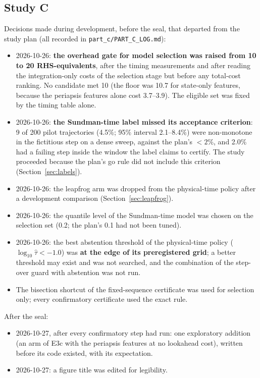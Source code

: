 \documentclass[10pt,letterpaper]{article}
\begin{document}
\subsection{Study C}
Decisions made during development, before the seal, that departed from the study plan (all recorded in \texttt{part\_c/PART\_C\_LOG.md}):
\begin{itemize}
\item 2026-10-26: \textbf{the overhead gate for model selection was raised from 10 to 20 RHS-equivalents}, after the timing measurements and after
reading the integration-only costs of the selection stage but before any total-cost ranking. No candidate met 10 (the floor was 10.7 for
state-only features, because the periapsis features alone cost 3.7--3.9). The eligible set was fixed by the timing table alone.
\item 2026-10-26: \textbf{the Sundman-time label missed its acceptance criterion}: 9 of 200 pilot trajectories (4.5\%; 95\% interval 2.1--8.4\%)
were non-monotone in the fictitious step on a dense sweep, against the plan's $<2\%$, and 2.0\% had a failing step inside the window the label
claims to certify. The study proceeded because the plan's go rule did not include this criterion (Section~\ref{sec:labels}).
\item 2026-10-26: the leapfrog arm was dropped from the physical-time policy after a development comparison (Section~\ref{sec:leapfrog}).
\item 2026-10-26: the quantile level of the Sundman-time model was chosen on the selection set (0.2; the plan's 0.1 had not been tuned).
\item 2026-10-26: the best abstention threshold of the physical-time policy ($\log_{10}\hat\tau < -1.0$) was \textbf{at the edge of its preregistered
grid}; a better threshold may exist and was not searched, and the combination of the step-over guard with abstention was not run.
\item The bisection shortcut of the fixed-sequence certificate was used for selection only; every confirmatory certificate used the exact rule.
\end{itemize}
After the seal:
\begin{itemize}
\item 2026-10-27, after every confirmatory step had run: one exploratory addition (an arm of E3c with the periapsis features at no lookahead cost),
written before its code existed, with its expectation.
\item 2026-10-27: a figure title was edited for legibility.
\end{itemize}
\end{document}
